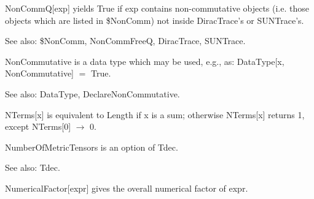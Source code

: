 

NonCommQ[exp] yields True if exp contains non-commutative objects (i.e. those objects which are listed in \${}NonComm) not inside
  DiracTrace's or SUNTrace's.

See also:  \${}NonComm, NonCommFreeQ, DiracTrace, SUNTrace.



NonCommutative is a data type which may be used, e.g., { }as: DataType[x, NonCommutative] \(=\) True.

See also: DataType, DeclareNonCommutative.



NTerms[x] is equivalent to Length if x is a sum; otherwise NTerms[x] returns 1, except NTerms[0] \(\rightarrow \) 0.












NumberOfMetricTensors is an option of Tdec.

See also:  Tdec.



NumericalFactor[expr] gives the overall numerical factor of expr.

